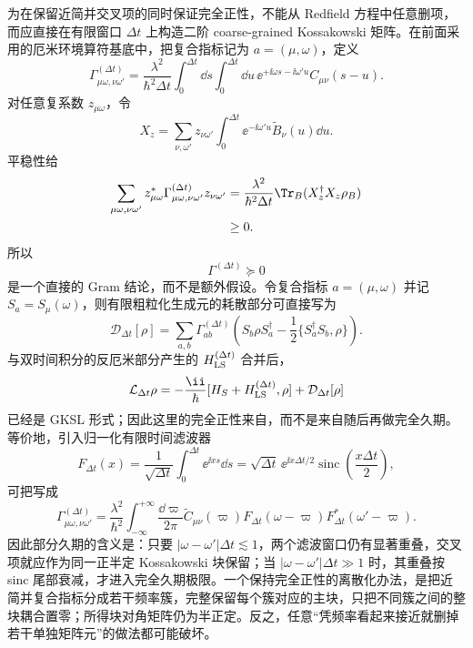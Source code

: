 为在保留近简并交叉项的同时保证完全正性，不能从 Redfield 方程中任意删项，而应直接在有限窗口 $\Delta t$ 上构造二阶 coarse-grained Kossakowski 矩阵。在前面采用的厄米环境算符基底中，把复合指标记为 $a=(\mu,\omega)$，定义
\begin{equation}
\Gamma_{\mu\omega,\nu\omega'}^{(\Delta t)}
=\frac{\lambda^2}{\hbar^2\Delta t}
\int_0^{\Delta t}\dd s\int_0^{\Delta t}\dd u\,
\ee^{+\ii\omega s-\ii\omega'u}
C_{\mu\nu}(s-u).
\label{eq:phys-oqs-coarse-grained-kossakowski}
\end{equation}
对任意复系数 $z_{\mu\omega}$，令
\[
X_z=\sum_{\nu,\omega'}z_{\nu\omega'}
\int_0^{\Delta t}\ee^{-\ii\omega'u}\widetilde B_\nu(u)\dd u.
\]
平稳性给
\begin{align}
\sum_{\mu\omega,\nu\omega'}
 z_{\mu\omega}^*
\Gamma_{\mu\omega,\nu\omega'}^{(\Delta t)}
 z_{\nu\omega'}
&=\frac{\lambda^2}{\hbar^2\Delta t}
\Tr_B(X_z^\dagger X_z\rho_B)\nonumber\\
&\ge0.
\label{eq:phys-oqs-coarse-grained-gram}
\end{align}
所以
\begin{equation}
\Gamma^{(\Delta t)}\succeq0
\label{eq:phys-oqs-coarse-grained-psd}
\end{equation}
是一个直接的 Gram 结论，而不是额外假设。令复合指标 $a=(\mu,\omega)$ 并记 $S_a=S_\mu(\omega)$，则有限粗粒化生成元的耗散部分可直接写为
\begin{equation}
\mathcal D_{\Delta t}[\rho]
=\sum_{a,b}\Gamma_{ab}^{(\Delta t)}
\left(
S_b\rho S_a^\dagger
-\frac12\{S_a^\dagger S_b,\rho\}
\right).
\label{eq:phys-oqs-coarse-grained-dissipator}
\end{equation}
与双时间积分的反厄米部分产生的 $H_{\rm LS}^{(\Delta t)}$ 合并后，
\[
\mathcal L_{\Delta t}\rho
=-\frac{\ii}{\hbar}[H_S+H_{\rm LS}^{(\Delta t)},\rho]
+\mathcal D_{\Delta t}[\rho]
\]
已经是 GKSL 形式；因此这里的完全正性来自，而不是来自随后再做完全久期。等价地，引入归一化有限时间滤波器
\[
F_{\Delta t}(x)=\frac1{\sqrt{\Delta t}}
\int_0^{\Delta t}\ee^{\ii xs}\dd s
=\sqrt{\Delta t}\,\ee^{\ii x\Delta t/2}
\operatorname{sinc}\!\left(\frac{x\Delta t}{2}\right),
\]
可把写成
\begin{equation}
\Gamma_{\mu\omega,\nu\omega'}^{(\Delta t)}
=\frac{\lambda^2}{\hbar^2}
\int_{-\infty}^{+\infty}\frac{\dd\varpi}{2\pi}
\widetilde C_{\mu\nu}(\varpi)
F_{\Delta t}(\omega-\varpi)
F_{\Delta t}^*(\omega'-\varpi).
\label{eq:phys-oqs-coarse-grained-spectral-filter}
\end{equation}
因此部分久期的含义是：只要 $|\omega-\omega'|\Delta t\lesssim1$，两个滤波窗口仍有显著重叠，交叉项就应作为同一正半定 Kossakowski 块保留；当 $|\omega-\omega'|\Delta t\gg1$ 时，其重叠按 sinc 尾部衰减，才进入完全久期极限。一个保持完全正性的离散化办法，是把近简并复合指标分成若干频率簇，完整保留每个簇对应的主块，只把不同簇之间的整块耦合置零；所得块对角矩阵仍为半正定。反之，任意“凭频率看起来接近就删掉若干单独矩阵元”的做法都可能破坏。

